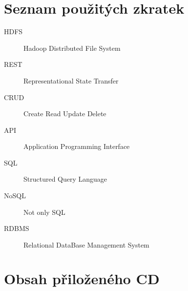 \documentclass[thesis=M,czech]{FITthesis}[2012/06/26]
\begin{document}
\chapter{Seznam použitých zkratek}
\begin{description}
	\item[HDFS] Hadoop Distributed File System
	\item[REST] Representational State Transfer
	\item[CRUD] Create Read Update Delete
	\item[API] Application Programming Interface
	\item[SQL] Structured Query Language
	\item[NoSQL] Not only SQL
	\item[RDBMS] Relational DataBase Management System
	

\end{description}



\chapter{Obsah přiloženého CD}


\begin{figure}
\end{figure}
\end{document}
